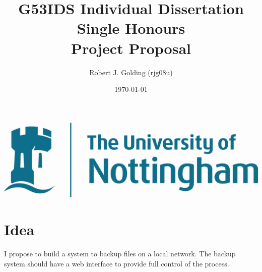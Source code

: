 \documentclass[a4paper]{article}
\title{
    \vspace{3cm}
    \huge{G53IDS Individual Dissertation Single Honours} \\[0.5cm]
    \LARGE{Project Proposal} \\[0.2cm]
}
\author{Robert J. Golding (rjg08u)} \date{\today}
\begin{document}
    \maketitle
    \vspace{10cm}
    \begin{center}
        \includegraphics{notts.jpg}
    \end{center}
    \newpage

    \section{Idea}
    I propose to build a system to backup files on a local network. The backup
    system should have a web interface to provide full control of the process.
\end{document}
